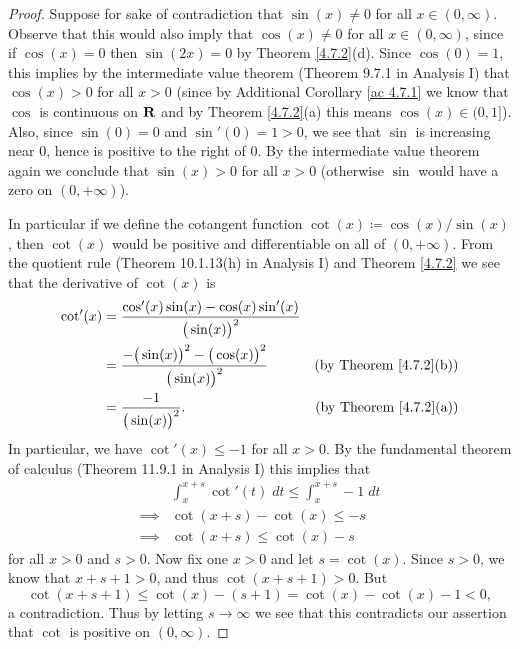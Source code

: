 \begin{proof}
    Suppose for sake of contradiction that \(\sin(x) \neq 0\) for all \(x \in (0, \infty)\).
    Observe that this would also imply that \(\cos(x) \neq 0\) for all \(x \in (0, \infty)\), since if \(\cos(x) = 0\) then \(\sin(2x) = 0\) by Theorem \ref{4.7.2}(d).
    Since \(\cos(0) = 1\), this implies by the intermediate value theorem (Theorem 9.7.1 in Analysis I) that \(\cos(x) > 0\) for all \(x > 0\)
    (since by Additional Corollary \ref{ac 4.7.1} we know that \(\cos\) is continuous on \(\mathbf{R}\) and by Theorem \ref{4.7.2}(a) this means \(\cos(x) \in (0, 1]\)).
    Also, since \(\sin(0) = 0\) and \(\sin'(0) = 1 > 0\), we see that \(\sin\) is increasing near \(0\), hence is positive to the right of \(0\).
    By the intermediate value theorem again we conclude that \(\sin(x) > 0\) for all \(x > 0\)
    (otherwise \(\sin\) would have a zero on \((0, +\infty)\)).

    In particular if we define the cotangent function \(\cot(x) \coloneqq \cos(x) / \sin(x)\), then \(\cot(x)\) would be positive and differentiable on all of \((0, +\infty)\).
    From the quotient rule (Theorem 10.1.13(h) in Analysis I) and Theorem \ref{4.7.2} we see that the derivative of \(\cot(x)\) is
    \begin{align*}
        \cot'(x) & = \frac{\cos'(x) \sin(x) - \cos(x) \sin'(x)}{\big(\sin(x)\big)^2}                                             \\
                 & = \frac{-\big(\sin(x)\big)^2 - \big(\cos(x)\big)^2}{\big(\sin(x)\big)^2} & \text{(by Theorem \ref{4.7.2}(b))} \\
                 & = \frac{-1}{\big(\sin(x)\big)^2}.                                        & \text{(by Theorem \ref{4.7.2}(a))}
    \end{align*}
    In particular, we have \(\cot'(x) \leq -1\) for all \(x > 0\).
    By the fundamental theorem of calculus (Theorem 11.9.1 in Analysis I) this implies that
    \begin{align*}
                 & \int_x^{x + s} \cot'(t) \; dt \leq \int_x^{x + s} -1 \; dt \\
        \implies & \cot(x + s) - \cot(x) \leq -s                              \\
        \implies & \cot(x + s) \leq \cot(x) - s
    \end{align*}
    for all \(x > 0\) and \(s > 0\).
    Now fix one \(x > 0\) and let \(s = \cot(x)\).
    Since \(s > 0\), we know that \(x + s + 1 > 0\), and thus \(\cot(x + s + 1) > 0\).
    But
    \[
        \cot(x + s + 1) \leq \cot(x) - (s + 1) = \cot(x) - \cot(x) - 1 < 0,
    \]
    a contradiction.
    Thus by letting \(s \to \infty\) we see that this contradicts our assertion that \(\cot\) is positive on \((0, \infty)\).
\end{proof}

